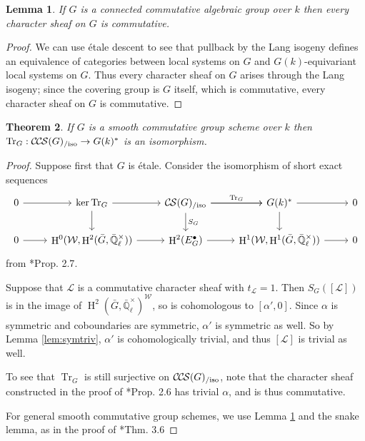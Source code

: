 \documentclass[10pt]{amsart}
\theoremstyle{plain}
\newtheorem{theorem}{Theorem}[section]
\newtheorem{lemma}[theorem]{Lemma}
\theoremstyle{definition}
\newcommand{\EE}{\mathbb{\bar Q}_\ell}
\newcommand{\Fq}{k}
\newcommand{\EEx}{\EE^\times}
\newcommand{\Weil}[1]{\mathcal{W}_{#1}}
\DeclareMathOperator{\Hh}{H}
\newcommand{\trFrob}[1]{t_{#1}}
\newcommand{\TrFrob}[1]{\operatorname{Tr}_{#1}}
\newcommand{\cs}[1]{{\mathcal{#1}}}
\newcommand{\CS}{{\mathcal{C\hskip-0.8pt S}}}
\newcommand{\CCS}{{\mathcal{C\hskip-.8pt C\hskip-0.8pt S}}}
\newcommand{\CSiso}[1]{\CS(#1)_{/\text{iso}}}
\newcommand{\CCSiso}[1]{\CCS(#1)_{/\text{iso}}}
\newcommand{\bG}{\bar{G}}
\begin{document}
\begin{lemma} \label{lem:conncomm}
If $G$ is a connected commutative algebraic group over $\Fq$ then every character sheaf on $G$ is commutative.
\end{lemma}

\begin{proof}
We can use \'etale descent to see that pullback by the Lang isogeny defines an equivalence
of categories between local systems on $G$ and $G(\Fq)$-equivariant local systems on $G$.  Thus every character
sheaf on $G$ arises through the Lang isogeny; since the covering group is $G$ itself, which is commutative,
every character sheaf on $G$ is commutative.
\end{proof}

\begin{theorem} \label{thm:trfrobiso}
If $G$ is a smooth commutative group scheme over $\Fq$ then $\TrFrob{G} : \CCSiso{G} \to G(\Fq)^*$ is an isomorphism.
\end{theorem}

\begin{proof}
Suppose first that $G$ is \'etale.  Consider the isomorphism of short exact sequences
\[
\begin{tikzcd}
 0 \arrow{r} & \ker \TrFrob{G} \arrow{d} \arrow{r} & \CSiso{G}\arrow{d}{S_G} \arrow{r}{\TrFrob{G}} \arrow{r} & G(\Fq)^* \arrow{d} \arrow{r} & 0\\
  0 \arrow{r} & \Hh^0(\Weil{},\Hh^2(\bG,\EEx)) \arrow{r} & \Hh^2(E^\bullet_G) \arrow{r} & \Hh^1(\Weil{},\Hh^1(\bG,\EEx)) \arrow{r} & 0
 \end{tikzcd}
 \]
from \cite{cunningham-roe:13a}*{Prop. 2.7}.

Suppose that $\cs{L}$ is a commutative character sheaf
with $\trFrob{\cs{L}} = 1$.  Then $S_G([\cs{L}])$ is in the image of $\Hh^2(\bG, \EEx)^\Weil{}$, so is cohomologous to
$[\alpha', 0]$.  Since $\alpha$ is symmetric and coboundaries are symmetric, $\alpha'$ is symmetric as well.
So by Lemma \ref{lem:symtriv}, $\alpha'$ is cohomologically trivial, and thus $[\cs{L}]$ is trivial as well.

To see that $\TrFrob{G}$ is still surjective on $\CCSiso{G}$, note that the character sheaf constructed in the proof of
\cite{cunningham-roe:13a}*{Prop. 2.6} has trivial $\alpha$, and is thus commutative.

For general smooth commutative group schemes, we use Lemma \ref{lem:conncomm} and the snake lemma, as in the proof of
\cite{cunningham-roe:13a}*{Thm. 3.6}
\end{proof}
\end{document}
